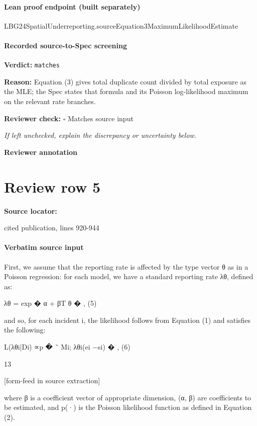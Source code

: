 \documentclass[10pt]{article}
\newcommand{\reviewerbox}{%
  \par\noindent\fbox{\parbox{0.96\linewidth}{\rule{0pt}{0.38in}}}\par
}
\newcommand{\reviewmatch}[1]{%
  \par\noindent\textbf{Reviewer check:} $\square$\; #1\par
  \noindent\emph{If left unchecked, explain the discrepancy or uncertainty below.}\par
}
\begin{document}
\paragraph{Lean proof endpoint (built separately)}\begin{ReviewVerbatim}
LBG24SpatialUnderreporting.sourceEquation3MaximumLikelihoodEstimate
\end{ReviewVerbatim}

\paragraph{Recorded source-to-Spec screening}
\textbf{Verdict:} \texttt{matches}
\\
{\raggedright
\textbf{Reason:} Equation (3) gives total duplicate count divided by total exposure as the MLE;\allowbreak{} the Spec states that formula and its Poisson log-\allowbreak{}likelihood maximum on the relevant rate branches.\allowbreak{}
\par}
\reviewmatch{Matches source input}
\noindent\textbf{Reviewer annotation}\par
\reviewerbox
\clearpage
\hypertarget{source-claim-91a0a6f8108d4306}{}
\section*{Review row 5}
\textbf{Source locator:} {\footnotesize\raggedright cited publication, lines 920-\allowbreak{}944\par}
\paragraph{Verbatim source input}
\begin{ReviewVerbatim}
First, we assume that the reporting rate is affected by the type vector θ as in a Poisson regression:
for each model, we have a standard reporting rate λθ, defined as:

λθ = exp
�
α + βT θ
�
,
(5)

and so, for each incident i, the likelihood follows from Equation (1) and satisfies the following:

L(λθi|Di) ∝p
�
˜
Mi; λθi(ei −si)
�
,
(6)

13


[form-feed in source extraction]

where β is a coefficient vector of appropriate dimension, (α, β) are coefficients to be estimated, and
p(·) is the Poisson likelihood function as defined in Equation (2).
\end{ReviewVerbatim}
\end{document}
